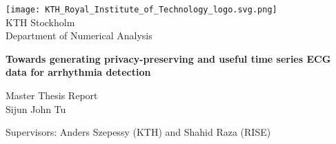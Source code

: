 \begin{titlepage}
	\begin{center}
		\vspace*{1cm}
		\texttt{[image: KTH\_Royal\_Institute\_of\_Technology\_logo.svg.png]}\\
		\Large
		KTH Stockholm\\
		Department of Numerical Analysis
		\vspace*{1cm}



		\Huge
		\textbf{Towards generating privacy-preserving and useful time series ECG data for arrhythmia detection
		}
		
		\vspace{0.5cm}
		
		\vspace{1.5cm}
		
		
		\vfill
		
		Master Thesis Report \\
		Sijun John Tu
		\vspace{0.8cm}

		
		\large
		Supervisors: Anders Szepessy (KTH) and Shahid Raza (RISE)\\
		
	\end{center}
\end{titlepage}